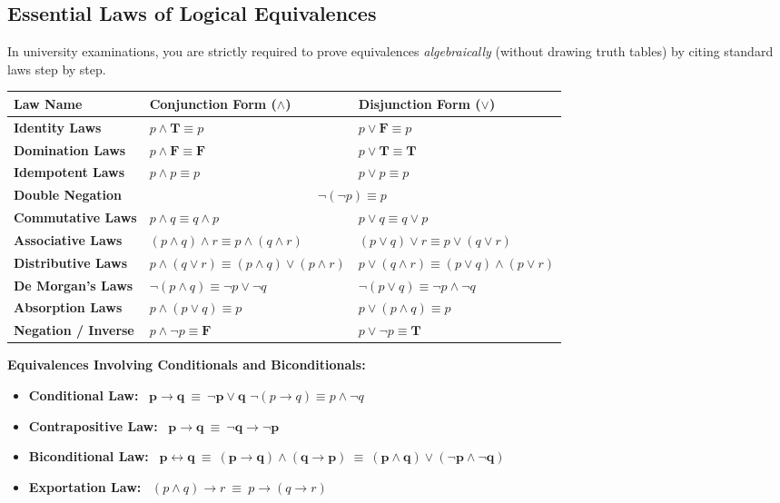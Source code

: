 \documentclass[11pt,a4paper]{article}
\begin{document}
\subsection{Essential Laws of Logical Equivalences}
In university examinations, you are strictly required to prove equivalences \textit{algebraically} (without drawing truth tables) by citing standard laws step by step.

\begin{theorembox}
\renewcommand{\arraystretch}{1.2}
\begin{tabularx}{\linewidth}{@{}l X X@{}}
\toprule
\textbf{Law Name} & \textbf{Conjunction Form ($\wedge$)} & \textbf{Disjunction Form ($\vee$)} \\
\midrule
\textbf{Identity Laws} & $p \wedge \mathbf{T} \equiv p$ & $p \vee \mathbf{F} \equiv p$ \\
\textbf{Domination Laws} & $p \wedge \mathbf{F} \equiv \mathbf{F}$ & $p \vee \mathbf{T} \equiv \mathbf{T}$ \\
\textbf{Idempotent Laws} & $p \wedge p \equiv p$ & $p \vee p \equiv p$ \\
\textbf{Double Negation} & \multicolumn{2}{c}{$\neg(\neg p) \equiv p$} \\
\textbf{Commutative Laws} & $p \wedge q \equiv q \wedge p$ & $p \vee q \equiv q \vee p$ \\
\textbf{Associative Laws} & $(p \wedge q) \wedge r \equiv p \wedge (q \wedge r)$ & $(p \vee q) \vee r \equiv p \vee (q \vee r)$ \\
\textbf{Distributive Laws} & $p \wedge (q \vee r) \equiv (p \wedge q) \vee (p \wedge r)$ & $p \vee (q \wedge r) \equiv (p \vee q) \wedge (p \vee r)$ \\
\textbf{De Morgan's Laws} & $\neg(p \wedge q) \equiv \neg p \vee \neg q$ & $\neg(p \vee q) \equiv \neg p \wedge \neg q$ \\
\textbf{Absorption Laws} & $p \wedge (p \vee q) \equiv p$ & $p \vee (p \wedge q) \equiv p$ \\
\textbf{Negation / Inverse} & $p \wedge \neg p \equiv \mathbf{F}$ & $p \vee \neg p \equiv \mathbf{T}$ \\
\bottomrule
\end{tabularx}

\medskip
\textbf{Equivalences Involving Conditionals and Biconditionals:}
\begin{itemize}
    \item \textbf{Conditional Law:} \ $\mathbf{p \rightarrow q \ \equiv \ \neg p \vee q}$ \qquad $\neg(p \rightarrow q) \equiv p \wedge \neg q$
    \item \textbf{Contrapositive Law:} \ $\mathbf{p \rightarrow q \ \equiv \ \neg q \rightarrow \neg p}$
    \item \textbf{Biconditional Law:} \ $\mathbf{p \leftrightarrow q \ \equiv \ (p \rightarrow q) \wedge (q \rightarrow p) \ \equiv \ (p \wedge q) \vee (\neg p \wedge \neg q)}$
    \item \textbf{Exportation Law:} \ $(p \wedge q) \rightarrow r \ \equiv \ p \rightarrow (q \rightarrow r)$
\end{itemize}
\end{theorembox}
\end{document}
